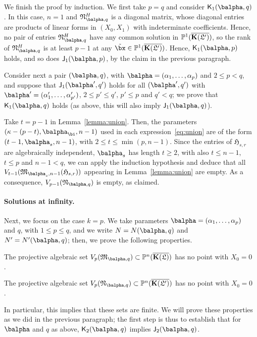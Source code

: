 \documentclass[12pt]{article}
\begin{document}
We finish the proof by induction. We first take $p=q$ and consider
$\assJ_1(\balpha,q)$.  In this case, $n=1$ and
$\mathfrak{N}^H_{\balpha,q}$ is a diagonal matrix, whose diagonal
entries are products of linear forms in $(X_0,X_1)$ with indeterminate
coefficients. Hence, no pair of entries $\mathfrak{N}^H_{\balpha,q}$
have any common solution in $\mathbb{P}^1(\overline{\mathbf{K}(\mathfrak{L}')})$, so the rank of
$\mathfrak{N}^H_{\balpha,q}$ is at least $p-1$ at any $\tilde\bx \in
\P^1(\KKGpbar)$. Hence, $\assJ_1(\balpha,p)$ holds, and so does
$\assI_1(\balpha,p)$, by the claim in the previous paragraph.

Consider next a pair $(\balpha,q)$, with
$\balpha=(\alpha_1,\dots,\alpha_p)$ and $2 \le p < q$, and suppose
that $\assI_1(\balpha',q')$ holds for all $(\balpha',q')$ with
$\balpha'=(\alpha'_1,\dots,\alpha'_{p'})$, $2 \le p' \le q'$, $p' \le p$ and $q'
< q$; we prove that $\assJ_1(\balpha,q)$ holds (as above, this will
also imply $\assI_1(\balpha,q)$).

Take $t=p-1$ in Lemma~\ref{lemma:union}. Then, the parameters
$(\kappa-(p-t),\balpha_\bi,n-1)$ used in each expression~\eqref{eq:union}
are of the form $(t-1,\balpha_s,n-1)$, with $2 \le t \le \min(p,n-1)$.
Since the entries of $\mathfrak{H}_{s,r}$ are algebraically
independent, $\balpha_s$ has length $t\ge 2$, with also $t \le n-1$, $t
\le p$ and $n-1 < q$, we can apply the induction hypothesis and deduce
that all $V_{t-1}(\mathfrak{M}_{\balpha_s,n-1}(\mathfrak{H}_{s,r}))$
appearing in Lemma~\ref{lemma:union} are empty. As a consequence,
$V_{p-1}(\mathfrak{N}_{\balpha,q})$ is empty, as claimed.


\paragraph{Solutions at infinity.} Next, we focus on the case $k=p$.
We take parameters $\balpha=(\alpha_1,\dots,\alpha_p)$ and $q$, with $1 \le p \le
q$, and we write $N=N(\balpha,q)$ and $N'=N'(\balpha,q)$; then, we prove the following properties.
\begin{description}[leftmargin=*]
\item[$\assI_2(\balpha,q).$] The projective algebraic set
  $V_p(\mathfrak{M}_{\balpha,q}) \subset \P^n(\KKGbar)$ has no point with $X_0=0$.
\item[$\assJ_2(\balpha,q).$] The projective algebraic set
  $V_p(\mathfrak{N}_{\balpha,q}) \subset \P^n(\KKGpbar)$ has no point with $X_0=0$.
\end{description}
 In particular, this implies that these sets are finite. We will prove
 these properties as we did in the previous paragraph; the first step
 is thus to establish that for $\balpha$ and $q$ as above, $\assJ_2(\balpha,q)$
 implies $\assI_2(\balpha,q)$.
\end{document}

